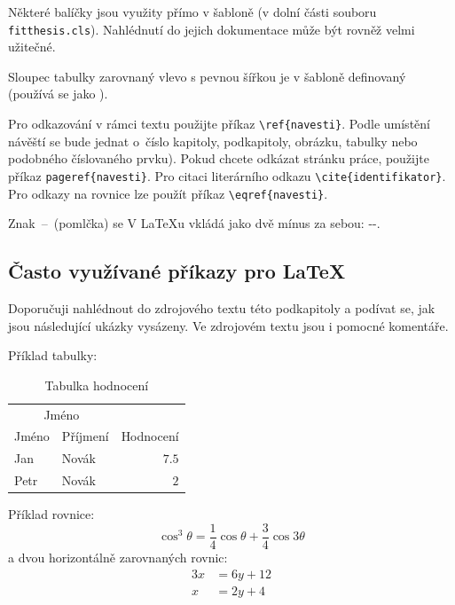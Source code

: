 Některé balíčky jsou využity přímo v šabloně (v dolní části souboru \texttt{fitthesis.cls}). Nahlédnutí do jejich dokumentace může být rovněž velmi užitečné.

Sloupec tabulky zarovnaný vlevo s pevnou šířkou je v šabloně definovaný  (používá se jako ).

Pro odkazování v rámci textu použijte příkaz \verb|\ref{navesti}|. Podle umístění návěští se bude jednat o~číslo kapitoly, podkapitoly, obrázku, tabulky nebo podobného číslovaného prvku). Pokud chcete odkázat stránku práce, použijte příkaz \verb|pageref{navesti}|. Pro citaci literárního odkazu \verb|\cite{identifikator}|. Pro odkazy na rovnice lze použít příkaz \verb|\eqref{navesti}|.

Znak \,--\, (pomlčka) se V \LaTeX u vkládá jako dvě mínus za sebou: -{}-.

\subsection*{Často využívané příkazy pro \LaTeX{}}
\label{sec:Fragments}

Doporučuji nahlédnout do zdrojového textu této podkapitoly a podívat se, jak jsou následující ukázky vysázeny. Ve zdrojovém textu jsou i pomocné komentáře.


Příklad tabulky:
\begin{table}[H]
	\vskip6pt
	\caption{Tabulka hodnocení} 
    \vskip6pt
	\centering
	\begin{tabular}{llr}
		\toprule
		\multicolumn{2}{c}{Jméno} \\
		\cmidrule(r){1-2}
		Jméno & Příjmení & Hodnocení \\
		\midrule
		Jan & Novák & $7.5$ \\
		Petr & Novák & $2$ \\
		\bottomrule
	\end{tabular}
	\label{tab:ExampleTable}
\end{table}


\noindent Příklad rovnice:
\begin{equation}
	\cos^3 \theta =\frac{1}{4}\cos\theta+\frac{3}{4}\cos 3\theta
	\label{eq:rovnice2}
\end{equation}
a dvou horizontálně zarovnaných rovnic: %
\begin{align} 
    \label{eq:soustava}
	3x &= 6y + 12 \\
	x &= 2y + 4 
\end{align}


